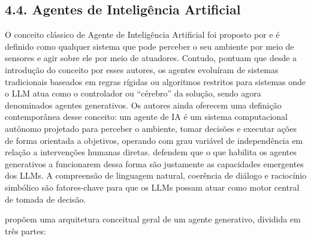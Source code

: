 \documentclass[12pt,oneside,a4paper,brazil,sumario=tradicional]{abntex2}
\begin{document}
\subsection*{4.4. Agentes de Inteligência Artificial}
O conceito clássico de Agente de Inteligência Artificial foi proposto por  e é definido como qualquer sistema que pode perceber o seu ambiente por meio de sensores e agir sobre ele por meio de atuadores. Contudo,  pontuam que desde a introdução do conceito por esses autores, os agentes evoluíram de sistemas tradicionais baseados em regras rígidas ou algoritmos restritos para sistemas onde o LLM atua como o controlador ou “cérebro” da solução, sendo agora denominados agentes generativos. Os autores ainda oferecem uma definição contemporânea desse conceito: um agente de IA é um sistema computacional autônomo projetado para perceber o ambiente, tomar decisões e executar ações de forma orientada a objetivos, operando com grau variável de independência em relação a intervenções humanas diretas.  defendem que o que habilita os agentes generativos a funcionarem dessa forma são justamente as capacidades emergentes dos LLMs. A compreensão de linguagem natural, coerência de diálogo e raciocínio simbólico são fatores-chave para que os LLMs possam atuar como motor central de tomada de decisão.

 propõem uma arquitetura conceitual geral de um agente generativo, dividida em três partes:
\end{document}
